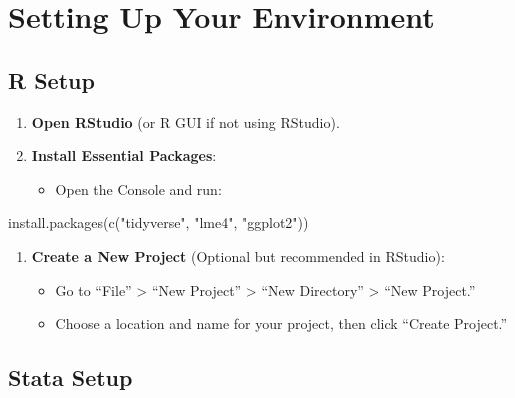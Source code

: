 \documentclass[
  letterpaper,
  DIV=11,
  numbers=noendperiod]{scrreprt}
\newenvironment{Shaded}{\begin{snugshade}}{\end{snugshade}}
\newcommand{\FunctionTok}[1]{\textcolor[rgb]{0.28,0.35,0.67}{#1}}
\newcommand{\NormalTok}[1]{\textcolor[rgb]{0.00,0.23,0.31}{#1}}
\newcommand{\StringTok}[1]{\textcolor[rgb]{0.13,0.47,0.30}{#1}}
\providecommand{\tightlist}{%
  \setlength{\itemsep}{0pt}\setlength{\parskip}{0pt}}\usepackage{longtable,booktabs,array}
\begin{document}
\section{Setting Up Your Environment}\label{setting-up-your-environment}

\subsection{R Setup}\label{r-setup}

\begin{enumerate}
\def\labelenumi{\arabic{enumi}.}
\tightlist
\item
  \textbf{Open RStudio} (or R GUI if not using RStudio).
\item
  \textbf{Install Essential Packages}:

  \begin{itemize}
  \tightlist
  \item
    Open the Console and run:
  \end{itemize}
\end{enumerate}

\begin{Shaded}
\begin{Highlighting}[]
   \FunctionTok{install.packages}\NormalTok{(}\FunctionTok{c}\NormalTok{(}\StringTok{"tidyverse"}\NormalTok{, }\StringTok{"lme4"}\NormalTok{, }\StringTok{"ggplot2"}\NormalTok{))}
\end{Highlighting}
\end{Shaded}

\begin{enumerate}
\def\labelenumi{\arabic{enumi}.}
\setcounter{enumi}{2}
\tightlist
\item
  \textbf{Create a New Project} (Optional but recommended in RStudio):

  \begin{itemize}
  \tightlist
  \item
    Go to ``File'' \textgreater{} ``New Project'' \textgreater{} ``New
    Directory'' \textgreater{} ``New Project.''
  \item
    Choose a location and name for your project, then click ``Create
    Project.''
  \end{itemize}
\end{enumerate}

\subsection{Stata Setup}\label{stata-setup}
\end{document}

